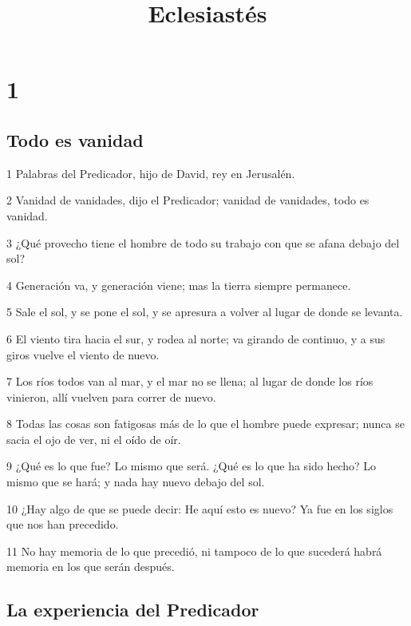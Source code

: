 

\title{Eclesiastés}

\chapter{1}

\section*{Todo es vanidad}

\par 1 Palabras del Predicador, hijo de David, rey en Jerusalén. 
\par 2 Vanidad de vanidades, dijo el Predicador; vanidad de vanidades, todo es vanidad.
\par 3 ¿Qué provecho tiene el hombre de todo su trabajo con que se afana debajo del sol?
\par 4 Generación va, y generación viene; mas la tierra siempre permanece.
\par 5 Sale el sol, y se pone el sol, y se apresura a volver al lugar de donde se levanta.
\par 6 El viento tira hacia el sur, y rodea al norte; va girando de continuo, y a sus giros vuelve el viento de nuevo.
\par 7 Los ríos todos van al mar, y el mar no se llena; al lugar de donde los ríos vinieron, allí vuelven para correr de nuevo.
\par 8 Todas las cosas son fatigosas más de lo que el hombre puede expresar; nunca se sacia el ojo de ver, ni el oído de oír.
\par 9 ¿Qué es lo que fue? Lo mismo que será. ¿Qué es lo que ha sido hecho? Lo mismo que se hará; y nada hay nuevo debajo del sol.
\par 10 ¿Hay algo de que se puede decir: He aquí esto es nuevo? Ya fue en los siglos que nos han precedido.
\par 11 No hay memoria de lo que precedió, ni tampoco de lo que sucederá habrá memoria en los que serán después.

\section*{La experiencia del Predicador}

